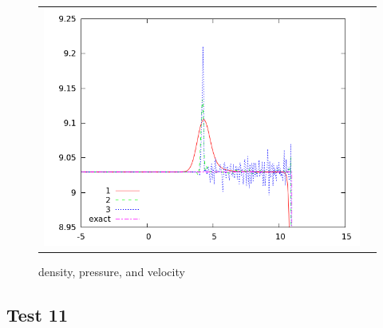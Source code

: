 \documentclass[letterpaper,12pt]{article}
\begin{document}
\begin{figure}[h]
\begin{center}
\begin{tabular}{cc}
      \includegraphics[width=.4\textwidth]{vel10zoom.png} \\
	\end{tabular}	
  \end{center}
  \caption{density, pressure, and velocity}
\end{figure}



\clearpage

\subsection{Test 11}
\end{document}
